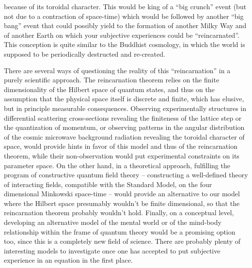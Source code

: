 because of its toroidal character. This would be king of a ``big crunch'' event (but not due to a contraction of space-time) which would be followed by another ``big bang'' event that could possibly yield to the formation of another Milky Way and of another Earth on which your subjective experiences could be ``reincarnated''. This conception is quite similar to the Buddhist cosmology, in which the world is supposed to be periodically destructed and re-created.

There are several ways of questioning the reality of this ``reincarnation'' in a purely scientific approach. The reincarnation theorem relies on the finite dimensionality of the Hilbert space of quantum states, and thus on the assumption that the physical space itself is discrete and finite, which has elusive, but in principle measurable consequences. Observing experimentally structures in differential scattering cross-sections revealing the finiteness of the lattice step or the quantization of momentum, or observing patterns in the angular distribution of the cosmic microwave background radiation revealing the toroidal character of space, would provide hints in favor of this model and thus of the reincarnation theorem, while their non-observation would put experimental constraints on its parameter space. On the other hand, in a theoretical approach, fulfilling the program of constructive quantum field theory -- constructing a well-defined theory of interacting fields, compatible with the Standard Model, on the four dimensional Minkowski space-time -- would provide an alternative to our model where the Hilbert space presumably wouldn't be finite dimensional, so that the reincarnation theorem probably wouldn't hold. Finally, on a conceptual level, developing an alternative model of the mental world or of the mind-body relationship within the frame of quantum theory would be a promising option too, since this is a completely new field of science. There are probably plenty of interesting models to investigate once one has accepted to put subjective experience in an equation in the first place.





